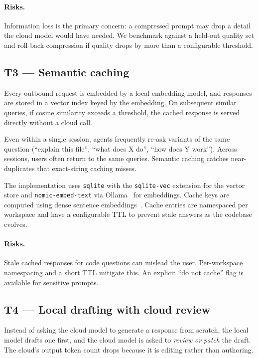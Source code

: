 \documentclass[11pt,a4paper]{article}
\begin{document}
\paragraph{Risks.}
Information loss is the primary concern: a compressed prompt may drop a
detail the cloud model would have needed. We benchmark against a
held-out quality set and roll back compression if quality drops by more
than a configurable threshold.

\subsection{T3 --- Semantic caching}
\label{sec:t3}

Every outbound request is embedded by a local embedding model, and
responses are stored in a vector index keyed by the embedding. On
subsequent similar queries, if cosine similarity exceeds a threshold,
the cached response is served directly without a cloud call.

Even within a single session, agents frequently re-ask variants of the
same question (``explain this file'', ``what does X do'', ``how does Y
work''). Across sessions, users often return to the same queries.
Semantic caching catches near-duplicates that exact-string caching
misses.

The implementation uses \texttt{sqlite} with the \texttt{sqlite-vec}
extension for the vector store and \texttt{nomic-embed-text} via
Ollama~\cite{ollama} for embeddings. Cache keys are computed using
dense sentence embeddings~\cite{reimers2019sbert}. Cache entries are namespaced per workspace and have a
configurable TTL to prevent stale answers as the codebase evolves.

\paragraph{Risks.}
Stale cached responses for code questions can mislead the user.
Per-workspace namespacing and a short TTL mitigate this. An explicit
``do not cache'' flag is available for sensitive prompts.

\subsection{T4 --- Local drafting with cloud review}
\label{sec:t4}

Instead of asking the cloud model to generate a response from scratch,
the local model drafts one first, and the cloud model is asked to
\emph{review or patch} the draft. The cloud's output token count drops
because it is editing rather than authoring.
\end{document}
